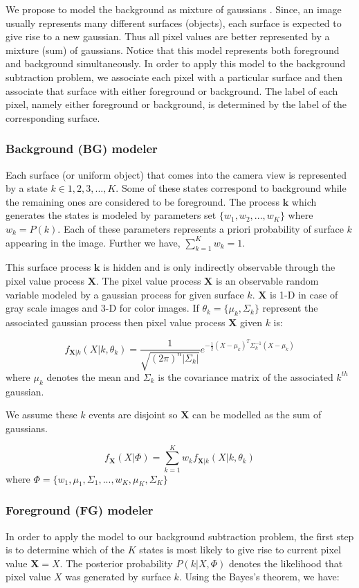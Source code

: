 We propose to model the background as mixture of gaussians \cite{stauffer1999adaptive,power2002understanding}. Since, an image usually represents many different surfaces (objects), each surface is expected to give rise to a new gaussian. Thus all pixel values are better represented by a mixture (sum) of gaussians. Notice that this model represents both foreground and background simultaneously. In order to apply this model to the background subtraction problem, we associate each pixel with a particular surface and then associate that surface with either foreground or background. The label of each pixel, namely either foreground or background, is determined by the label of the corresponding surface. 

\subsubsection{Background (BG) modeler}
Each surface (or uniform object) that comes into the camera view is represented by a state $k \in {1,2,3,...,K}$. Some of these states correspond to  background while the remaining ones are considered to be foreground. The process  $\mathbf{k}$ which generates the states is modeled by parameters set $\{w_1, w_2, ..., w_K\}$ where $w_k = P(k)$. Each of these parameters represents  a priori probability of surface $k$ appearing in the image. Further we have, $\sum_{k=1}^K w_k=1$. 

This surface process $\mathbf{k}$ is hidden and is only indirectly observable through the pixel value process $\mathbf{X}$. The pixel value process $\mathbf{X}$ is an observable random variable modeled by a gaussian process for given surface $k$. $\mathbf{X}$ is 1-D in case of gray scale images and 3-D for color images.  If $\theta_k= \{\mu_k, \Sigma_k \}$  represent the associated gaussian process then pixel value process $\mathbf{X}$ given $k$ is: 

$$ f_{\mathbf{X}|k}(X|k,\theta_k)=\frac{1}{\sqrt{(2\pi)^n |\Sigma_k |}}e^{-\frac{1}{2}(X-\mu_k)^T \Sigma_k^{-1} (X-\mu_k)} $$
where $\mu_k$ denotes the mean and $\Sigma_k$ is the covariance matrix of the associated $k^{th}$ gaussian. 

We assume these $k$ events are disjoint so $\mathbf{X}$ can be modelled as the sum of gaussians. 

$$ f_{\mathbf{X}}(X|\Phi)=\sum_{k=1}^K w_k f_{\mathbf{X}|k}(X|k,\theta_k)  $$
where $ \Phi = \{w_1, \mu_1, \Sigma_1,..., w_K, \mu_K, \Sigma_K \}$ 

\subsubsection{Foreground (FG) modeler}
In order to apply the model to our background subtraction problem, the first step is to determine which of the $K$ states is most likely to give rise to current pixel value $\mathbf{X}=X$. The posterior probability $P(k|X,\Phi)$ denotes the likelihood that pixel value $X$ was generated by surface $k$. Using the Bayes's theorem, we have:

